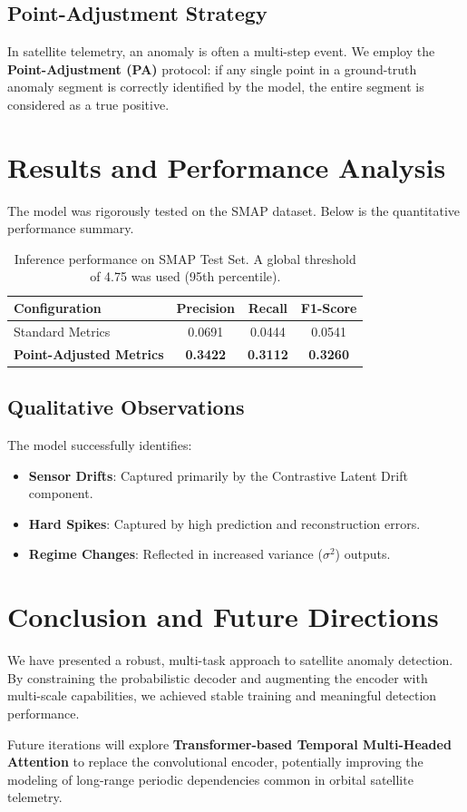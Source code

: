 \documentclass[12pt,a4paper]{article}
\begin{document}
\subsection{Point-Adjustment Strategy}
In satellite telemetry, an anomaly is often a multi-step event. We employ the \textbf{Point-Adjustment (PA)} protocol: if any single point in a ground-truth anomaly segment is correctly identified by the model, the entire segment is considered as a true positive.

\section{Results and Performance Analysis}
The model was rigorously tested on the SMAP dataset. Below is the quantitative performance summary.

\begin{table}[h!]
\centering
\begin{tabular}{l c c c}
\toprule
\textbf{Configuration} & \textbf{Precision} & \textbf{Recall} & \textbf{F1-Score} \\ 
\midrule
Standard Metrics & 0.0691 & 0.0444 & 0.0541 \\
\textbf{Point-Adjusted Metrics} & \textbf{0.3422} & \textbf{0.3112} & \textbf{0.3260} \\ 
\bottomrule
\end{tabular}
\caption{Inference performance on SMAP Test Set. A global threshold of 4.75 was used (95th percentile).}
\end{table}

\subsection{Qualitative Observations}
The model successfully identifies:
\begin{itemize}
    \item \textbf{Sensor Drifts}: Captured primarily by the Contrastive Latent Drift component.
    \item \textbf{Hard Spikes}: Captured by high prediction and reconstruction errors.
    \item \textbf{Regime Changes}: Reflected in increased variance ($\sigma^2$) outputs.
\end{itemize}

\section{Conclusion and Future Directions}
We have presented a robust, multi-task approach to satellite anomaly detection. By constraining the probabilistic decoder and augmenting the encoder with multi-scale capabilities, we achieved stable training and meaningful detection performance. 

Future iterations will explore \textbf{Transformer-based Temporal Multi-Headed Attention} to replace the convolutional encoder, potentially improving the modeling of long-range periodic dependencies common in orbital satellite telemetry.
\end{document}

